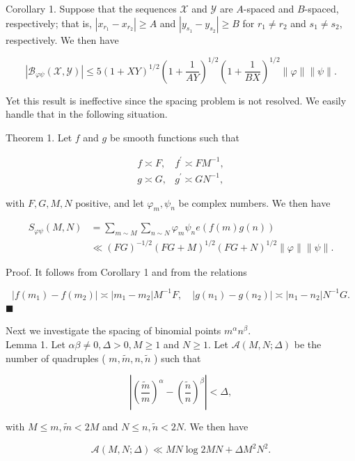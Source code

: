 \documentclass[10pt]{article}
\begin{document}
Corollary 1. Suppose that the sequences $\mathscr{X}$ and $\mathscr{Y}$ are $A$-spaced and $B$-spaced, respectively; that is, $\left|x_{r_{1}}-x_{r_{2}}\right| \geqslant A$ and $\left|y_{s_{1}}-y_{s_{2}}\right| \geqslant B$ for $r_{1} \neq r_{2}$ and $s_{1} \neq s_{2}$, respectively. We then have

$$
\left|\mathscr{B}_{\varphi \psi}(\mathscr{X}, \mathscr{Y})\right| \leqslant 5(1+X Y)^{1 / 2}\left(1+\frac{1}{A Y}\right)^{1 / 2}\left(1+\frac{1}{B X}\right)^{1 / 2}\|\varphi\|\|\psi\| .
$$

Yet this result is ineffective since the spacing problem is not resolved. We easily handle that in the following situation.

Theorem 1. Let $f$ and $g$ be smooth functions such that

$$
\begin{array}{ll}
f \asymp F, & f^{\prime} \asymp F M^{-1}, \\
g \asymp G, & g^{\prime} \asymp G N^{-1},
\end{array}
$$

with $F, G, M, N$ positive, and let $\varphi_{m}, \psi_{n}$ be complex numbers. We then have

$$
\begin{aligned}
S_{\varphi \psi}(M, N) & =\sum_{m \sim M} \sum_{n \sim N} \varphi_{m} \psi_{n} e(f(m) g(n)) \\
& \ll(F G)^{-1 / 2}(F G+M)^{1 / 2}(F G+N)^{1 / 2}\|\varphi\|\|\psi\| .
\end{aligned}
$$

Proof. It follows from Corollary 1 and from the relations

$$
\left|f\left(m_{1}\right)-f\left(m_{2}\right)\right| \asymp\left|m_{1}-m_{2}\right| M^{-1} F, \quad\left|g\left(n_{1}\right)-g\left(n_{2}\right)\right| \asymp\left|n_{1}-n_{2}\right| N^{-1} G .
$$ \(\blacksquare\)

Next we investigate the spacing of binomial points $m^{\alpha} n^{\beta}$.\\
Lemma 1. Let $\alpha \beta \neq 0, \Delta>0, M \geqslant 1$ and $N \geqslant 1$. Let $\mathscr{A}(M, N ; \Delta)$ be the number of quadruples ( $m, \tilde{m}, n, \tilde{n}$ ) such that

$$
\left|\left(\frac{\tilde{m}}{m}\right)^{\alpha}-\left(\frac{\tilde{n}}{n}\right)^{\beta}\right|<\Delta,
$$

with $M \leqslant m, \tilde{m}<2 M$ and $N \leqslant n, \tilde{n}<2 N$. We then have

$$
\mathscr{A}(M, N ; \Delta) \ll M N \log 2 M N+\Delta M^{2} N^{2} .
$$
\end{document}
